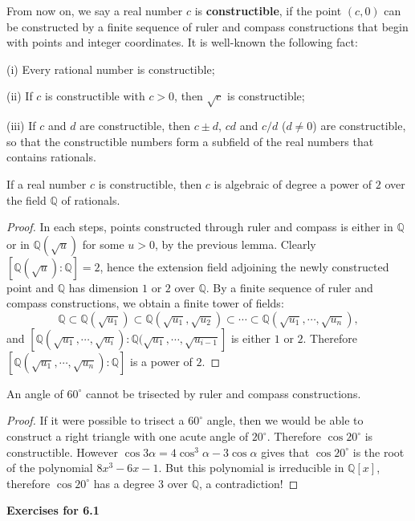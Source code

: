 From now on, we say a real number $c$ is \textbf{constructible}, if the point $(c,0)$ can be constructed by a finite sequence of ruler and compass constructions that begin with points and integer coordinates. It is well-known the following fact:\par
(i) Every rational number is constructible;\par
(ii) If $c$ is constructible with $c>0$, then $\sqrt{c}$ is constructible;\par
(iii) If $c$ and $d$ are constructible, then $c\pm d$, $cd$ and $c/d$ ($d\ne 0$) are constructible, so that the constructible numbers form a subfield of the real numbers that contains rationals.
\begin{proposition}
If a real number $c$ is constructible, then $c$ is algebraic of degree a power of $2$ over the field $\mathbb{Q}$ of rationals.
\end{proposition}
\begin{proof}
In each steps, points constructed through ruler and compass is either in $\mathbb{Q}$ or in $\mathbb{Q}(\sqrt{u})$ for some $u>0$, by the previous lemma. Clearly $[\mathbb{Q}(\sqrt{u}):\mathbb{Q}]=2$, hence the extension field adjoining the newly constructed point and $\mathbb{Q}$ has dimension $1$ or $2$ over $\mathbb{Q}$. By a finite sequence of ruler and compass constructions, we obtain a finite tower of fields: 
$$
\mathbb{Q} \subset \mathbb{Q} \left( \sqrt{u_1} \right) \subset \mathbb{Q} \left( \sqrt{u_1},\sqrt{u_2} \right) \subset \cdots \subset \mathbb{Q} \left( \sqrt{u_1},\cdots ,\sqrt{u_n} \right) ,
$$
and $[\mathbb{Q}(\sqrt{u_1},\cdots,\sqrt{u_i}):\mathbb{Q}(\sqrt{u_1},\cdots,\sqrt{u_{i-1}}]$ is either $1$ or $2$. Therefore $[\mathbb{Q}(\sqrt{u_1},\cdots,\sqrt{u_n}):\mathbb{Q}]$ is a power of $2$.
\end{proof}
\begin{corollary}
An angle of $60^\circ$ cannot be trisected by ruler and compass constructions.
\end{corollary}
\begin{proof}
If it were possible to trisect a $60^\circ$ angle, then we would be able to construct a right triangle with one acute angle of $20^\circ$. Therefore $\cos 20^\circ$ is constructible. However $\cos 3\alpha=4\cos^3\alpha-3\cos\alpha$ gives that $\cos 20^\circ$ is the root of the polynomial $8x^3-6x-1$. But this polynomial is irreducible in $\mathbb{Q}[x]$, therefore $\cos 20^\circ$ has a degree $3$ over $\mathbb{Q}$, a contradiction!
\end{proof}
\begin{center}
\begin{large}
    \textbf{Exercises for 6.1}
\end{large}
\end{center}
